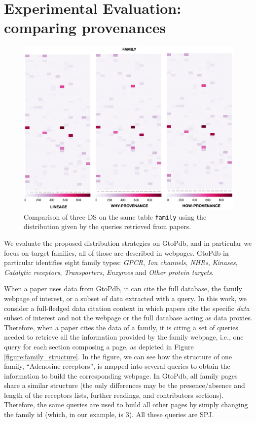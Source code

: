 \section{Experimental Evaluation: comparing provenances}
\label{sec:experiments}

\begin{figure}[t]
  \includegraphics[width=1\textwidth]{figures/paper_based}
  \caption{Comparison of three DS on the same table \texttt{family} using the distribution given by the queries retrieved from papers.}
  \label{figure:comparison_on_papers}
\end{figure}

We evaluate the proposed distribution strategies on GtoPdb, and in particular we focus on target families, all of those are described in webpages. 
GtoPdb in particular identifies eight family types: \emph{GPCR}, \emph{Ion channels}, \emph{NHRs}, \emph{Kinases}, \emph{Catalytic receptors}, \emph{Transporters}, \emph{Enzymes} and \emph{Other protein targets}.  

When a paper uses data from GtoPdb, it can cite the full database, the family webpage of interest, or a subset of data extracted with a query. 
In this work, we consider a full-fledged data citation context in which papers cite the specific \emph{data} subset of interest and not the webpage or the full database acting as data proxies.  
Therefore, when a paper cites the data of a family, it is citing a set of queries needed to retrieve all the information provided by the family webpage, i.e., one query for each section composing a page, as depicted in Figure \ref{figure:family_structure}. 
In the figure, we can see how the structure of one family, ``Adenosine receptors'', is mapped into several queries to obtain the information to build the corresponding webpage. 
In GtoPdb, all family pages share a similar structure (the only differences may be the presence/absence and length of the receptors lists, further readings, and contributors sections).
Therefore, the same queries are used to build all other pages by simply changing the family id (which, in our example, is 3). All these queries are SPJ. 

